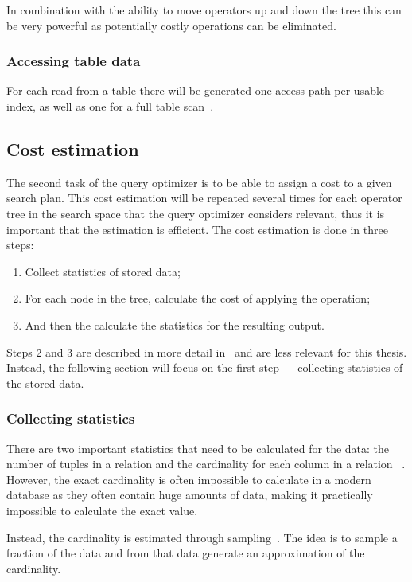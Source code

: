 In combination with the ability to move operators up and down the tree this can
be very powerful as potentially costly operations can be eliminated.

\subsubsection{Accessing table data}
For each read from a table there will be generated one access path per usable
index, as well as one for a full table
scan~\cite[p.~827-829]{garcia-molina_2002_database_dstcb}.

\subsection{Cost estimation}
The second task of the query optimizer is to be able to assign a cost to a given
search plan. This cost estimation will be repeated several times for each
operator tree in the search space that the query optimizer considers relevant,
thus it is important that the estimation is efficient. The cost estimation is
done in three steps:
\begin{enumerate}
\item Collect statistics of stored data;
\item For each node in the tree, calculate the cost of applying the operation;
\item And then the calculate the statistics for the resulting output.
\end{enumerate}

Steps 2 and 3 are described in more detail
in~\cite{chaudhuri_1998_overview_aooqoirs} and are less relevant for this
thesis. Instead, the following section will focus on the first step ---
collecting statistics of the stored data.

\subsubsection{Collecting statistics}\label{sec:collecting_statistics}
There are two important statistics that need to be calculated for the data: the
number of tuples in a relation and the cardinality for each column in a relation
~\cite[p.~807-808]{garcia-molina_2002_database_dstcb}. However, the exact
cardinality is often impossible to calculate in a modern database as they often
contain huge amounts of data, making it practically impossible to calculate the
exact value.

Instead, the cardinality is estimated through
sampling~\cite[p.~807-808]{garcia-molina_2002_database_dstcb}. The idea is to
sample a fraction of the data and from that data generate an approximation of
the cardinality.

